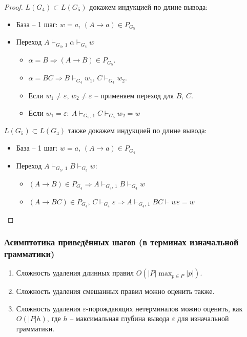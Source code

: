 \documentclass[a4paper,12pt]{article}
\theoremstyle{plain}
\theoremstyle{definition}
\theoremstyle{remark}
\begin{document}
\begin{proof}
	$L(G_4) \subset L(G_5)$ докажем индукцией по длине вывода:
	\begin{itemize}
		\item База -- 1 шаг: $w = a,\, (A \to a) \in P_{G_5}$
		\item Переход $A \vdash_{G_4,\,1}\alpha \vdash_{G_4} w$
		      \begin{itemize}
			      \item $\alpha = B \Rightarrow (A \to B) \in P_{G_5}$.
			      \item $\alpha = BC \Rightarrow B \vdash_{G_4} w_1,\, C \vdash_{G_4} w_2$.
			      \item Если $w_1 \neq \varepsilon,\, w_2 \neq \varepsilon$ -- применяем переход для $B,\, C$.
			      \item Если $w_1 = \varepsilon:\: A \vdash_{G_5,\,1} C \vdash_{G_5} w_2 = w$
		      \end{itemize}
	\end{itemize}
	$L(G_5) \subset L(G_4)$ также докажем индукцией по длине вывода:
	\begin{itemize}
		\item База -- 1 шаг: $w = a,\, (A \to a) \in P_{G_4}$
		\item Переход $A \vdash_{G_5,\,1} B \vdash_{G_5} w$:
		      \begin{itemize}
			      \item $(A \to B) \in P_{G_4} \Rightarrow A \vdash_{G_4,\,1} B \vdash_{G_4} w$
			      \item $(A \to BC) \in P_{G_4},\, C \vdash_{G_4} \varepsilon \Rightarrow A \vdash_{G_4,\,1} BC \vdash w\varepsilon = w$
		      \end{itemize}
	\end{itemize}


\end{proof}

\subsubsection*{Асимптотика приведённых шагов (в терминах изначальной грамматики)}
\begin{enumerate}
	\item Сложность удаления длинных правил $O(\vert P \vert \max_{p \in P}\vert p \vert)$.
	\item Сложность удаления смешанных правил можно оценить также.
	\item Сложность удаления $\varepsilon$-порождающих нетерминалов можно оценить, как $O(\vert P \vert h)$, где $h$ -- максимальная глубина вывода $\varepsilon$ для изначальной грамматики.
\end{enumerate}
\end{document}
